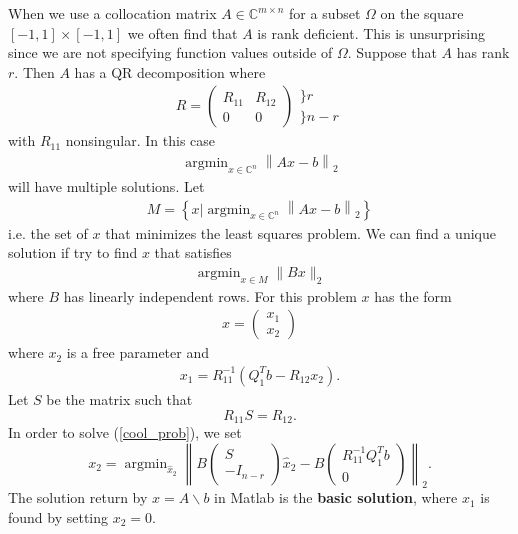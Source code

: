 \documentclass{article}
\DeclareMathOperator*{\argmin}{argmin}
\newcommand{\C}{\mathbb{C}}
\begin{document}
When we  use a collocation matrix $A \in \C^{m \times n}$ for a subset $\Omega$ on the square $[-1,1] \times [-1,1]$ we often find that $A$ is rank deficient. This is unsurprising since we are not specifying function values outside of $\Omega$. Suppose that $A$ has rank $r$. Then $A$ has a QR decomposition where
\begin{align}
R = \begin{pmatrix}
 R_{11} & R_{12} \\
 0 & 0
 \end{pmatrix}
 \begin{array}{l}
 \} r \\
 \} n-r
 \end{array}
\end{align}
 with $R_{11}$ nonsingular. In this case
 \begin{align}
 \argmin_{x \in \C^n} \left \| Ax-b\right \|_2
 \end{align}
will have multiple solutions. Let
\begin{align}
M = \left \{ x |  \argmin_{x \in \C^n} \left \| Ax-b\right \|_2 \right \}
\end{align}
i.e. the set of $x$ that minimizes the least squares problem. We can find a unique solution if try to find $x$ that satisfies
\begin{align}
\argmin_{x \in M} \| B x \|_2
\label{cool_prob}
\end{align}
where $B$ has linearly independent rows. For this problem $x$ has the form
\begin{align}
x = \begin{pmatrix}
 x_1 \\
 x_2
 \end{pmatrix}
\end{align}
where $x_2$ is a free parameter and 
\begin{align}
x_1 = R_{11}^{-1}(Q_1^{T}b-R_{12}x_2).
\end{align}
Let $S$ be the matrix such that
\begin{equation}
R_{11} S = R_{12}.
\end{equation}
In order to solve (\ref{cool_prob}), we set
\begin{equation}
x_2 = \argmin_{\hat{x}_2}\left \| B \begin{pmatrix} S \\ -I_{n-r} \end{pmatrix} \hat{x}_2 - B \begin{pmatrix} R_{11}^{-1}Q_1^{T}b \\ 0 \end{pmatrix}
\right \|_2.
\end{equation}
The solution return by $x=A\backslash b$ in Matlab is the \textbf{basic solution}, where $x_1$ is found by setting $x_2=0$.
\end{document}
